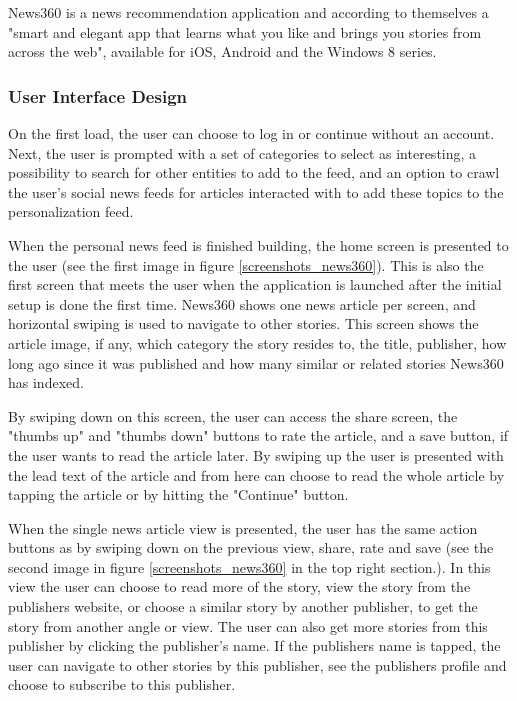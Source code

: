 News360 is a news recommendation application and according to themselves a "smart and elegant app that learns what you like and brings you stories from across the web"\cite{news360_about}, available for iOS, Android and the Windows 8 series.

\subsubsection{User Interface Design}
On the first load, the user can choose to log in or continue without an account. Next, the user is prompted with a set of categories to select as interesting, a possibility to search for other entities to add to the feed, and an option to crawl the user's social news feeds for articles interacted with to add these topics to the personalization feed.

When the personal news feed is finished building, the home screen is presented to the user (see the first image in figure \ref{screenshots_news360}). This is also the first screen that meets the user when the application is launched after the initial setup is done the first time. News360 shows one news article per screen, and horizontal swiping is used to navigate to other stories. This screen shows the article image, if any, which category the story resides to, the title, publisher, how long ago since it was published and how many similar or related stories News360 has indexed.

By swiping down on this screen, the user can access the share screen, the "thumbs up" and "thumbs down" buttons to rate the article, and a save button, if the user wants to read the article later. By swiping up the user is presented with the lead text of the article and from here can choose to read the whole article by tapping the article or by hitting the "Continue" button.

When the single news article view is presented, the user has the same action buttons as by swiping down on the previous view, share, rate and save (see the second image in figure \ref{screenshots_news360} in the top right section.). In this view the user can choose to read more of the story, view the story from the publishers website, or choose a similar story by another publisher, to get the story from another angle or view. The user can also get more stories from this publisher by clicking the publisher's name. If the publishers name is tapped, the user can navigate to other stories by this publisher, see the publishers profile and choose to subscribe to this publisher.

